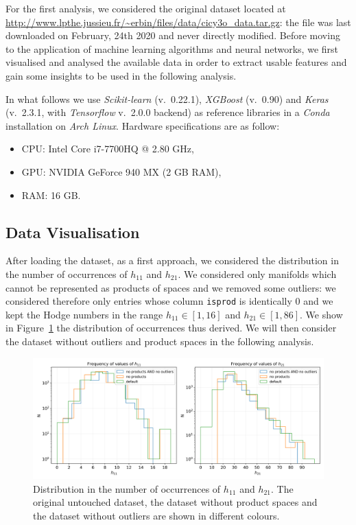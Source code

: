 For the first analysis, we considered the original dataset located at \url{http://www.lpthe.jussieu.fr/~erbin/files/data/cicy3o_data.tar.gz}: the file was last downloaded on February, 24th 2020 and never directly modified. Before moving to the application of machine learning algorithms and neural networks, we first visualised and analysed the available data in order to extract usable features and gain some insights to be used in the following analysis.

In what follows we use \textit{Scikit-learn} (v.\ 0.22.1), \textit{XGBoost} (v.\ 0.90) and \textit{Keras} (v.\ 2.3.1, with \textit{Tensorflow} v.\ 2.0.0 backend) as reference libraries in a \textit{Conda} installation on \textit{Arch Linux}. Hardware specifications are as follow:
\begin{itemize}
    \item CPU: Intel Core i7-7700HQ @ 2.80 GHz,
    \item GPU: NVIDIA GeForce 940 MX (2 GB RAM),
    \item RAM: 16 GB.
\end{itemize}

\subsection{Data Visualisation}

    After loading the dataset, as a first approach, we considered the distribution in the number of occurrences of $h_{11}$ and $h_{21}$. We considered only manifolds which cannot be represented as products of spaces and we removed some outliers: we considered therefore only entries whose column \texttt{isprod} is identically $0$ and we kept the Hodge numbers in the range $h_{11} \in \left[ 1, 16 \right]$ and $h_{21} \in \left[1, 86 \right]$. We show in Figure~\ref{fig:distribution_occurrences} the distribution of occurrences thus derived. We will then consider the dataset without outliers and product spaces in the following analysis.
    
    \begin{figure}[!t]
        \centering
        \includegraphics[width=\textwidth]{tex/img/h11_h21_occurrencies.png}
        \caption{Distribution in the number of occurrences of $h_{11}$ and $h_{21}$. The original untouched dataset, the dataset without product spaces and the dataset without outliers are shown in different colours.}
        \label{fig:distribution_occurrences}
    \end{figure}
    
